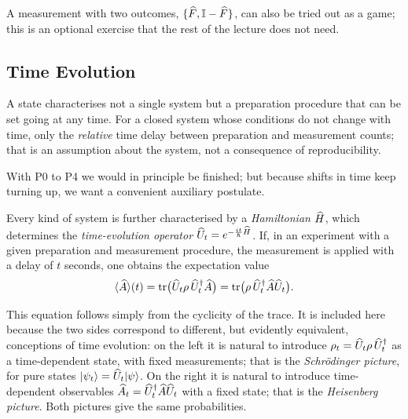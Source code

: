 \begin{webonly}
A measurement with two outcomes, $\{\widehat{F}, \mathbb{I}-\widehat{F}\}$, can also be tried out as a game; this is an optional exercise that the rest of the lecture does not need.
\end{webonly}


\subsection{Time Evolution}
A state characterises not a single system but a preparation procedure that can be set going at any time. For a closed system whose conditions do not change with time, only the \emph{relative} time delay between preparation and measurement counts; that is an assumption about the system, not a consequence of reproducibility.

With P0 to P4 we would in principle be finished; but because shifts in time keep turning up, we want a convenient auxiliary postulate.

\begin{merksatz}[P5]
	Every kind of system is further characterised by a \emph{Hamiltonian} $\widehat{H}$, which determines the \emph{time-evolution operator} $\widehat{U}_t = e^{-\frac{it}{\hbar}\widehat{H}}$. If, in an experiment with a given preparation and measurement procedure, the measurement is applied with a delay of $t$ seconds, one obtains the expectation value
	\begin{equation}
		\langle\widehat{A}\rangle(t) = \operatorname{tr}\bigl(\widehat{U}_t\rho\,\widehat{U}_t^{\dagger}\widehat{A}\bigr) = \operatorname{tr}\bigl(\rho\,\widehat{U}_t^{\dagger}\widehat{A}\widehat{U}_t\bigr).
	\end{equation}
\end{merksatz}
This equation follows simply from the cyclicity of the trace. It is included here because the two sides correspond to different, but evidently equivalent, conceptions of time evolution: on the left it is natural to introduce $\rho_t = \widehat{U}_t\rho\,\widehat{U}_t^{\dagger}$ as a time-dependent state, with fixed measurements; that is the \emph{Schrödinger picture}, for pure states $\lvert \psi_t \rangle = \widehat{U}_t\lvert \psi \rangle$. On the right it is natural to introduce time-dependent observables $\widehat{A}_t = \widehat{U}_t^{\dagger}\widehat{A}\widehat{U}_t$ with a fixed state; that is the \emph{Heisenberg picture}. Both pictures give the same probabilities.


